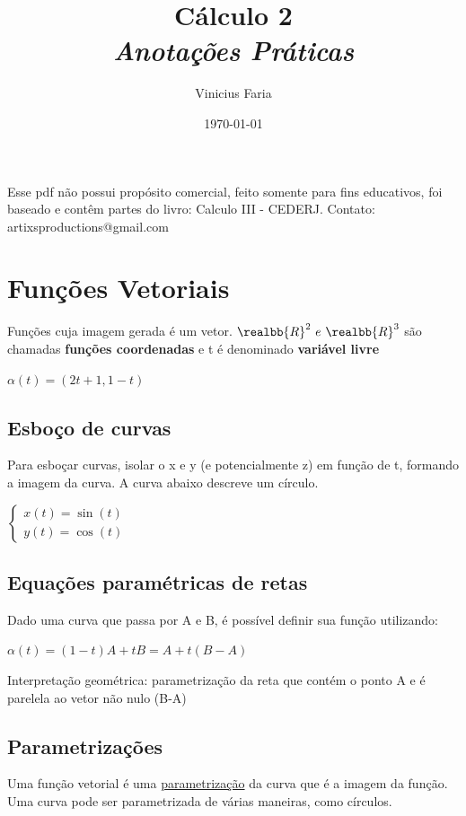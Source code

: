 \documentclass[letterpaper, 11pt]{article}
\author{Vinicius Faria}
\date{\today}
\title{Cálculo 2\\\medskip
\large \emph{Anotações Práticas}}
\begin{document}
\maketitle
\tableofcontents

Esse pdf não possui propósito comercial, feito somente para fins educativos, foi baseado e contêm partes do livro: Calculo III - CEDERJ. Contato: artixsproductions@gmail.com

\section{Funções Vetoriais}
\label{sec:org1ea2024}
Funções cuja imagem gerada é um vetor. \(\realbb{R}^2 \ e \ \realbb{R}^3\) são chamadas \textbf{funções coordenadas} e t é denominado \textbf{variável livre}

\begin{center}   $\alpha(t) = (2t+1, 1-t)$ \end{center}

\subsection{Esboço de curvas}
\label{sec:org5849d6e}
Para esboçar curvas, isolar o x e y (e potencialmente z) em função de t, formando a imagem da curva. A curva abaixo descreve um círculo.

\begin{center} $\begin{cases} x(t) = \sin (t) \\ y(t) = \cos(t) \end{cases}$ \end{center}

\subsection{Equações paramétricas de retas}
\label{sec:orge694608}
Dado uma curva que passa por A e B, é possível definir sua função utilizando:

\begin{center} $\alpha (t) = (1-t)A + tB = A + t(B-A)$ \end{center}

Interpretação geométrica: parametrização da reta que contém o ponto A e é parelela ao vetor não nulo (B-A)

\subsection{Parametrizações}
\label{sec:orgf522ea3}
Uma função vetorial é uma \uline{parametrização} da curva que é a imagem da função. Uma curva pode ser parametrizada de várias maneiras, como círculos.
\end{document}
